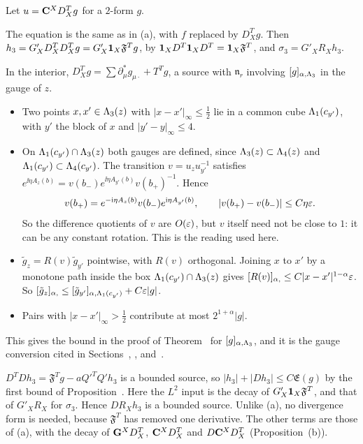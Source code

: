 \begin{detail}\label{d8:ix7}
Let $u=\mathbf C^XD^T_Xg$ for a $2$-form $g$.
\begin{step}
The equation is the same as in (a), with $f$ replaced by $D^T_Xg$. Then $h_3=G'_XD^T_XD^T_Xg=G'_X\mathbf 1_X\mathfrak F^Tg$, by $\mathbf 1_XD^T\mathbf 1_XD^T=\mathbf 1_X\mathfrak F^T$, and $\sigma_3=G'_XR_Xh_3$.
\end{step}
\begin{step}
In the interior, $D^T_Xg=\sum\partial^*_\mu g_{\mu\cdot}+T^Tg$, a source with $\mathfrak n_r$ involving $[g]_{\alpha,\Lambda_3}$ in the gauge of $z$.
\begin{itemize}
\item Two points $x,x'\in\Lambda_3(z)$ with $|x-x'|_\infty\le\frac12$ lie in a common cube $\Lambda_1(c_{y'})$, with $y'$ the block of $x$ and $|y'-y|_\infty\le4$.
\item On $\Lambda_1(c_{y'})\cap\Lambda_3(z)$ both gauges are defined, since $\Lambda_3(z)\subset\Lambda_4(z)$ and $\Lambda_1(c_{y'})\subset\Lambda_4(c_{y'})$. The transition $v=u_zu_{y'}^{-1}$ satisfies $e^{\ii\eta A_z(b)}=v(b_-)e^{\ii\eta A_{y'}(b)}v(b_+)^{-1}$. Hence
\[
v(b_+)=e^{-\mathrm i\eta A_z(b)}v(b_-)e^{\mathrm i\eta A_{y'}(b)},\qquad|v(b_+)-v(b_-)|\le C\eta\varepsilon .
\]
So the difference quotients of $v$ are $O(\varepsilon)$, but $v$ itself need not be close to $1$: it can be any constant rotation. This is the reading used here.
\item $\tilde g_z=R(v)\tilde g_{y'}$ pointwise, with $R(v)$ orthogonal. Joining $x$ to $x'$ by a monotone path inside the box $\Lambda_1(c_{y'})\cap\Lambda_3(z)$ gives $[R(v)]_{\alpha,}\le C|x-x'|^{1-\alpha}\varepsilon$. So $[\tilde g_z]_{\alpha,}\le[\tilde g_{y'}]_{\alpha,\Lambda_1(c_{y'})}+C\varepsilon|g|$.
\item Pairs with $|x-x'|_\infty>\frac12$ contribute at most $2^{1+\alpha}|g|$.
\end{itemize}
This gives the bound in the proof of Theorem~ for $[g]_{\alpha,\Lambda_3}$, and it is the gauge conversion cited in Sections~, ,  and~.
\end{step}
\begin{step}
$D^TDh_3=\mathfrak F^Tg-aQ'^TQ'h_3$ is a bounded source, so $|h_3|+|Dh_3|\le C\mathfrak E(g)$ by the first bound of Proposition~. Here the $L^2$ input is the decay of $G'_X\mathbf 1_X\mathfrak F^T$, and that of $G'_XR_X$ for $\sigma_3$. Hence $DR_Xh_3$ is a bounded source. Unlike (a), no divergence form is needed, because $\mathfrak F^T$ has removed one derivative. The other terms are those of (a), with the decay of $\mathbf G^XD^T_X$, $\mathbf C^XD^T_X$ and $D\mathbf C^XD^T_X$ (Proposition~(b)).
\end{step}
\end{detail}

